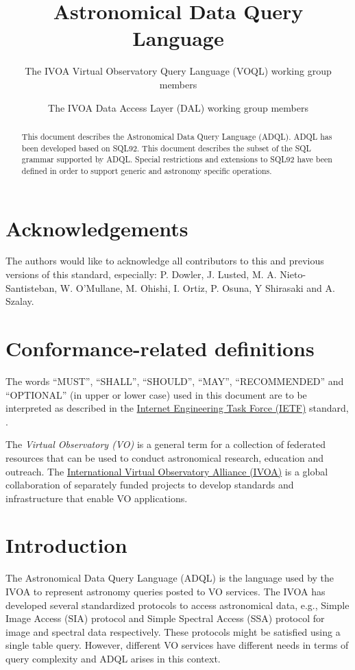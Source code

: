 \documentclass[11pt,a4paper]{ivoa}
\title{Astronomical Data Query Language}
\author[http://wiki.ivoa.net/twiki/bin/view/IVOA/IvoaVOQL]{The IVOA Virtual Observatory Query Language (VOQL) working group members}
\author[http://wiki.ivoa.net/twiki/bin/view/IVOA/IvoaDAL]{The IVOA Data Access Layer (DAL) working group members}
\begin{document}
\begin{abstract}
This document describes the Astronomical Data Query Language (ADQL).
ADQL has been developed based on SQL92.
This document describes the subset of the SQL grammar supported by ADQL.
Special restrictions and extensions to SQL92 have been defined in order
to support generic and astronomy specific operations.
\end{abstract}

\section*{Acknowledgements}

The authors would like to acknowledge all contributors to this and previous 
versions of this standard, especially:
P. Dowler,
J. Lusted,
M. A. Nieto-Santisteban,
W. O'Mullane,
M. Ohishi,
I. Ortiz,
P. Osuna,
Y Shirasaki
and
A. Szalay.

\section*{Conformance-related definitions}

The words ``MUST'', ``SHALL'', ``SHOULD'', ``MAY'', ``RECOMMENDED'' and
``OPTIONAL'' (in upper or lower case) used in this document are to be
interpreted as described in the
\href{https://www.ietf.org/}{Internet Engineering Task Force (IETF)}
standard, \citet{std:RFC2119}.

The \emph{Virtual Observatory (VO)} is a general term for a collection of
federated resources that can be used to conduct astronomical research,
education and outreach. The
\href{http://www.ivoa.net}{International Virtual Observatory Alliance (IVOA)}
is a global collaboration of separately funded
projects to develop standards and infrastructure that enable VO applications.

\clearpage
\section{Introduction}
\label{sec:introduction}

The Astronomical Data Query Language (ADQL) is the language used by the
IVOA to represent astronomy queries posted to VO services.
The IVOA has developed several standardized protocols to access astronomical
data, e.g., Simple Image Access (SIA) protocol and Simple Spectral Access (SSA)
protocol for image and spectral data respectively.
These protocols might be satisfied using a single
table query. However, different VO services have different needs in terms
of query complexity and ADQL arises in this context.
\end{document}
